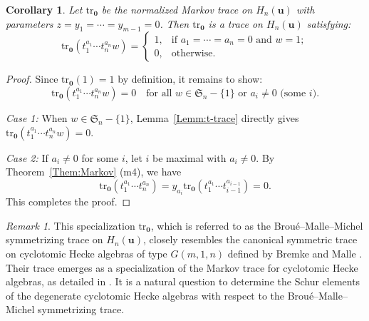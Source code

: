 \documentclass[a4paper, oneside]{amsart}
\numberwithin{equation}{section}
\newtheorem{corollary}[equation]{Corollary}
\theoremstyle{definition}
\theoremstyle{remark}
\newtheorem{remark}[equation]{Remark}
\begin{document}
\begin{corollary}\label{Cor:t-trace}
Let $\mathrm{tr}_{\boldsymbol{0}}$ be the normalized Markov trace on $H_n(\boldsymbol{u})$ with parameters $z = y_1 = \cdots = y_{m-1} = 0$. Then $\mathrm{tr}_{\boldsymbol{0}}$ is a trace on $H_n(\boldsymbol{u})$ satisfying:
\begin{equation*}
  \mathrm{tr}_{\boldsymbol{0}}(t_1^{a_1} \cdots t_n^{a_n}w) =\begin{cases}
1, & \text{if } a_1 = \cdots = a_n = 0 \text{ and } w = 1; \\
0, & \text{otherwise}.
\end{cases}
\end{equation*}
\end{corollary}

\begin{proof}
Since $\mathrm{tr}_{\boldsymbol{0}}(1) = 1$ by definition, it remains to show:
\[
\mathrm{tr}_{\boldsymbol{0}}(t_1^{a_1} \cdots t_n^{a_n}w) = 0 \quad \text{for all } w \in \mathfrak{S}_n-\{1\} \text{ or } a_i \neq 0 \text{ (some } i\text{)}.
\]

\textit{Case 1:} When $w \in \mathfrak{S}_n-\{1\}$, Lemma~\ref{Lemm:t-trace} directly gives $\mathrm{tr}_{\boldsymbol{0}}(t_1^{a_1} \cdots t_n^{a_n}w) = 0$.

\textit{Case 2:} If $a_i \neq 0$ for some $i$, let $i$ be maximal with $a_i \neq 0$. By Theorem~\ref{Them:Markov} (m4), we have
\begin{equation*}
  \mathrm{tr}_{\boldsymbol{0}}(t_1^{a_1} \cdots t_n^{a_n}) = y_{a_i} \mathrm{tr}_{\boldsymbol{0}}(t_1^{a_1} \cdots t_{i-1}^{a_{i-1}}) = 0.
\end{equation*}
This completes the proof.
\end{proof}

\begin{remark}
This specialization $\mathrm{tr}_{\boldsymbol{0}}$, which is referred to as the Brou\'{e}--Malle--Michel symmetrizing trace on $H_n(\boldsymbol{u})$, closely resembles the canonical symmetric trace on cyclotomic Hecke algebras of type $G(m,1,n)$ defined by Bremke and Malle \cite{BM}. Their trace emerges as a specialization of the Markov trace for cyclotomic Hecke algebras, as detailed in \cite[Lemma~4.3]{GIM}. It is a natural question to determine the Schur elements of the degenerate cyclotomic Hecke algebras with respect to the Brou\'{e}--Malle--Michel symmetrizing trace.
\end{remark}
\end{document}
